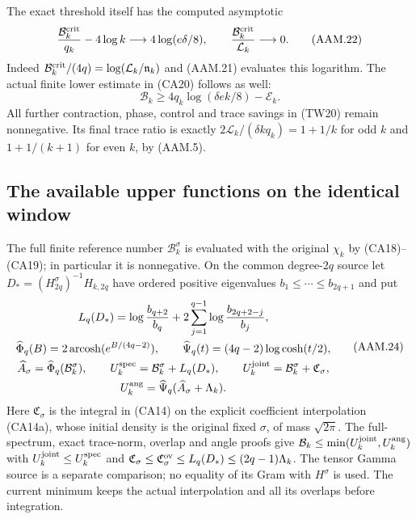 The exact threshold itself has the computed asymptotic
\[
 \frac{\mathcal B_k^{\rm crit}}{q_k}-4\log k
          \longrightarrow4\log(e\delta/8),\qquad
 \frac{\mathcal B_k^{\rm crit}}{\mathcal L_k}\longrightarrow0.
 \tag{AAM.22}
\]
Indeed $\mathcal B_k^{\rm crit}/(4q)=\log(\mathcal L_k/
\mathfrak n_k)$ and (AAM.21) evaluates this logarithm.
The actual finite lower estimate in (CA20) follows as well:
\[
 \mathcal B_k\geq4q_k\log(\delta e k/8)-\mathcal E_k.
 \tag{AAM.23}
\]
All further contraction, phase, control and trace savings in (TW20)
remain nonnegative. Its final trace ratio is exactly
$2\mathcal L_k/(\delta kq_k)=1+1/k$ for odd $k$ and
$1+1/(k+1)$ for even $k$, by (AAM.5).

\subsection{The available upper functions on the identical window}

The full finite reference number $\mathcal B_k^\sigma$ is evaluated
with the original $\chi_k$ by (CA18)--(CA19); in particular it is
nonnegative. On the common degree-$2q$ source let
$D_*=(H_{2q}^\sigma)^{-1}H_{k,2q}$ have ordered positive
eigenvalues $b_1\leq\cdots\leq b_{2q+1}$ and put
\[
 \begin{gathered}
 L_q(D_*)=\log\frac{b_{q+2}}{b_q}
           +2\sum_{j=1}^{q-1}\log\frac{b_{2q+2-j}}{b_j},\\
 \widehat\Phi_q(B)=2\operatorname{arcosh}(e^{B/(4q-2)}),\qquad
 \widehat\Psi_q(t)=(4q-2)\log\cosh(t/2),\\
 \widehat A_\sigma=\widehat\Phi_q(\mathcal B_k^\sigma),\qquad
 U_k^{\rm spec}=\mathcal B_k^\sigma+L_q(D_*),\qquad
 U_k^{\rm joint}=\mathcal B_k^\sigma+\mathfrak C_\sigma,\\
 U_k^{\rm ang}=\widehat\Psi_q(\widehat A_\sigma+\Lambda_k).
 \end{gathered}
 \tag{AAM.24}
\]
Here $\mathfrak C_\sigma$ is the integral in (CA14) on the
explicit coefficient interpolation (CA14a), whose initial density
is the original fixed $\sigma$, of mass $\sqrt{2\pi}$.
The full-spectrum, exact trace-norm, overlap and angle proofs give
$\mathcal B_k\le\min(U_k^{\rm joint},U_k^{\rm ang})$ with
$U_k^{\rm joint}\le U_k^{\rm spec}$ and
$\mathfrak C_\sigma\le\mathfrak C_\sigma^{\rm ov}
\le L_q(D_*)\le(2q-1)\Lambda_k$.
The tensor Gamma source is a separate comparison; no equality of
its Gram with $H^\sigma$ is used. The current minimum keeps the
actual interpolation and all its overlaps before integration.

